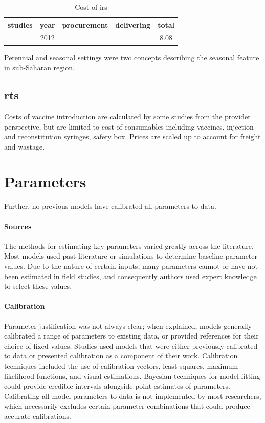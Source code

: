 \documentclass[a4paper, 12pt, twoside]{article}
\begin{document}
\begin{table}[htpb]
	\centering
	\caption{Cost of \gls{irs}}
	\label{tab:cost_of_irs}
	\begin{tabular}{cSSSS}
		\toprule
		studies           & {year} & {procurement} & {delivering} & {total} \\
		\midrule
		\cite{Walker2016} & 2012   &               &              & 8.08    \\
		\bottomrule
	\end{tabular}
\end{table}

Perennial and seasonal settings were two concepts describing the seasonal feature in sub-Saharan region.

\subsection{\texorpdfstring{\gls{rts}}{RTS}}%
\label{sub:rts}
Costs of vaccine introduction are calculated by some studies\cite{Hay2004} from the provider perspective, but are limited to cost of
consumables including vaccines, injection and reconstitution syringes, safety box.
Prices are scaled up to account for freight\cite{Winskill2017a} and wastage\cite{Hutton2006}.

\section{Parameters}
Further, no previous models have calibrated all parameters to data.

\paragraph{Sources}%
\label{par:sources}
The methods for estimating key parameters varied greatly across the literature.
Most models used past literature or simulations to determine baseline parameter values.
Due to the nature of certain inputs, many parameters cannot or have not been estimated in field studies, and consequently authors used expert knowledge to select these values.

\paragraph{Calibration}%
\label{par:calibration}
Parameter justification was not always clear\cite{Gurarie2007,Arifin2011a,NiazArifin2013}; when explained, models generally calibrated a range of parameters to existing data, or provided references for their choice of fixed values.
Studies used models that were either previously calibrated to data or presented calibration as a component of their work.
Calibration techniques included the use of calibration vectors, least squares, maximum likelihood functions, and visual estimations.
Bayesian techniques for model fitting could provide credible intervals alongside point estimates of parameters.
Calibrating all model parameters to data is not implemented by most researchers, which necessarily excludes certain parameter combinations that could produce accurate calibrations.
\end{document}

